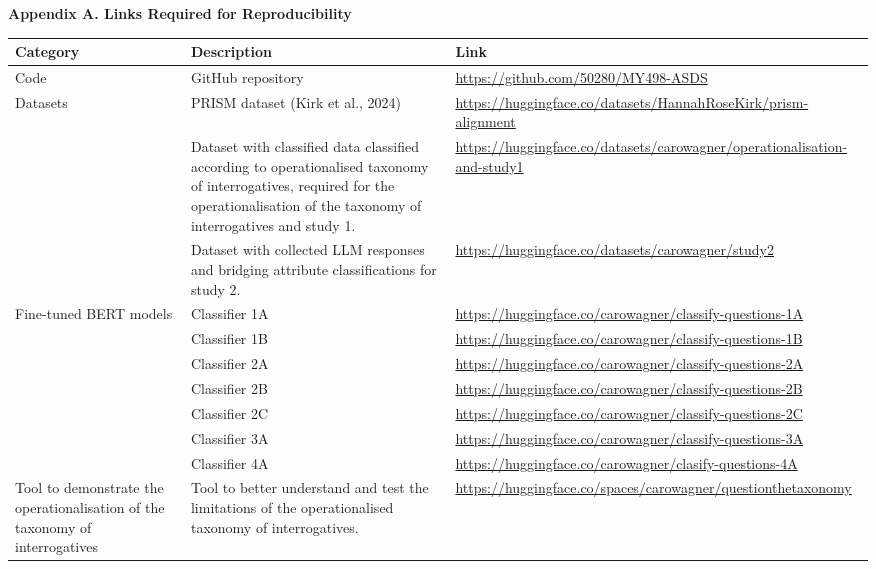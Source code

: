\documentclass{article}
\begin{document}
\begin{center}
\textbf{\large Appendix A. Links Required for Reproducibility}
\end{center}

\vspace{1em}

{\small
\renewcommand{\arraystretch}{1.2}
\begin{tabular}{p{3.5cm} p{6.5cm} p{8cm}}
\toprule
\textbf{Category} & \textbf{Description} & \textbf{Link} \\
\midrule
Code & GitHub repository & \url{https://github.com/50280/MY498-ASDS} \\
\addlinespace[0.7em]
Datasets & PRISM dataset (Kirk et al., 2024) & \url{https://huggingface.co/datasets/HannahRoseKirk/prism-alignment} \\
\addlinespace[0.7em]
 & Dataset with classified data classified according to operationalised taxonomy of interrogatives, required for the operationalisation of the taxonomy of interrogatives and study 1. & \url{https://huggingface.co/datasets/carowagner/operationalisation-and-study1} \\
\addlinespace[0.7em]
 & Dataset with collected LLM responses and bridging attribute classifications for study 2. & \url{https://huggingface.co/datasets/carowagner/study2} \\
\addlinespace[0.7em]
Fine-tuned BERT models & Classifier 1A & \url{https://huggingface.co/carowagner/classify-questions-1A} \\
\addlinespace[0.7em]
 & Classifier 1B & \url{https://huggingface.co/carowagner/classify-questions-1B} \\
\addlinespace[0.7em]
 & Classifier 2A & \url{https://huggingface.co/carowagner/classify-questions-2A} \\
\addlinespace[0.7em]
 & Classifier 2B & \url{https://huggingface.co/carowagner/classify-questions-2B} \\
\addlinespace[0.7em]
 & Classifier 2C & \url{https://huggingface.co/carowagner/classify-questions-2C} \\
\addlinespace[0.7em]
 & Classifier 3A & \url{https://huggingface.co/carowagner/classify-questions-3A} \\
\addlinespace[0.7em]
 & Classifier 4A & \url{https://huggingface.co/carowagner/clasify-questions-4A} \\
\addlinespace[0.7em]
Tool to demonstrate the operationalisation of the taxonomy of interrogatives & Tool to better understand and test the limitations of the operationalised taxonomy of interrogatives. & \url{https://huggingface.co/spaces/carowagner/questionthetaxonomy} \\
\bottomrule
\end{tabular}
}
\end{document}
